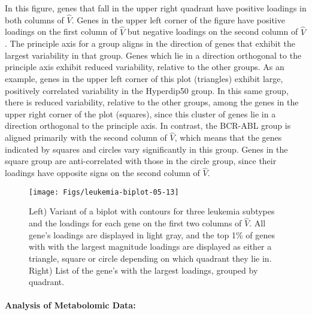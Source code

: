 \documentclass[12pt]{article}
\begin{document}
In this figure, genes that fall in the upper right quadrant have
positive loadings in both columns of $\hat{V}$. Genes in the upper left
corner of the figure have positive loadings on the first column of $\hat{V}$
but negative loadings on the second column of $\hat{V}$.  The principle axis
for a group aligns in the direction of genes that exhibit the largest
variability in that group.  Genes which lie in a direction orthogonal
to the principle axis exhibit reduced variability, relative to the
other groups. As an example, genes in the upper left corner of this
plot (triangles) exhibit large, positively correlated variability in
the Hyperdip50 group.  In this same group, there is reduced
variability, relative to the other groups, among the genes in the
upper right corner of the plot (squares), since this cluster of genes lie in
a direction orthogonal to the principle axis.  In contrast, the
BCR-ABL group is aligned primarily with the second column of $\hat{V}$,
which means that the genes indicated by squares and circles vary
significantly in this group.  Genes in the square group are
anti-correlated with those in the circle group, since their
loadings have opposite signs on the second column of $\hat{V}$.


  \begin{figure}[!ht]
    \centering
    \texttt{[image: Figs/leukemia-biplot-05-13]}
    \qquad
\raisebox{1.25\height}{
\footnotesize

}
\caption{Left) Variant of a biplot with contours for three leukemia
  subtypes and the loadings for each gene on the first two columns of
  $\hat{V}$.  All gene's loadings are displayed in light gray, and the
  top 1\% of genes with with the largest magnitude loadings are
  displayed as either a triangle, square or circle depending on which
  quadrant they lie in.  Right) List of the gene's with the largest
  loadings, grouped by quadrant. }
\label{fig:leukemiaBiplot}
  \end{figure}

\paragraph{Analysis of Metabolomic Data:}
\end{document}
